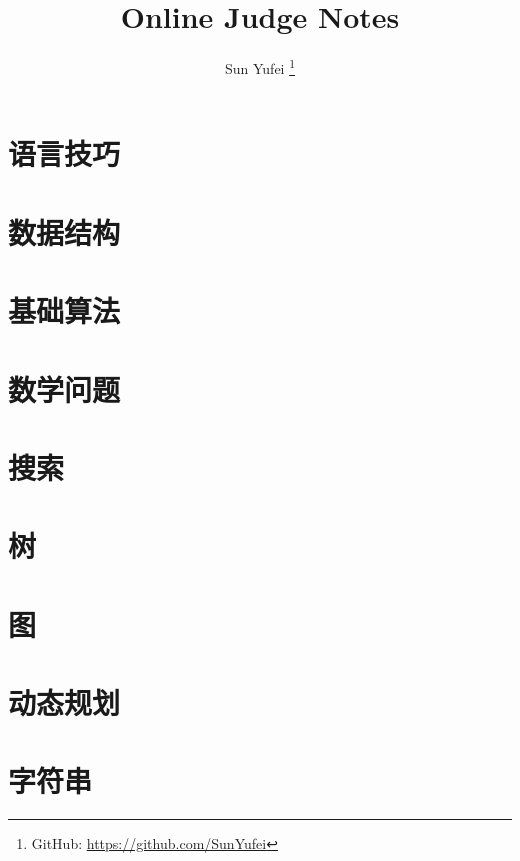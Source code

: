\documentclass{template}
\title{Online Judge Notes}
\author{Sun Yufei \thanks{GitHub: \href{https://github.com/SunYufei}{https://github.com/SunYufei}}}
\begin{document}
	\maketitle
	
	\tableofcontents
	
	\newpage
	\section{语言技巧}
	
	
	\section{数据结构}
	
	
	\newpage
	\section{基础算法}
	
	
	\newpage
	\section{数学问题}
	
	
	\newpage
	\section{搜索}
	
	
	\newpage
	\section{树}
	
	
	\newpage
	\section{图}
	
	
	\newpage
	\section{动态规划}
	
	
	\newpage
	\section{字符串}
	
	
\end{document}
